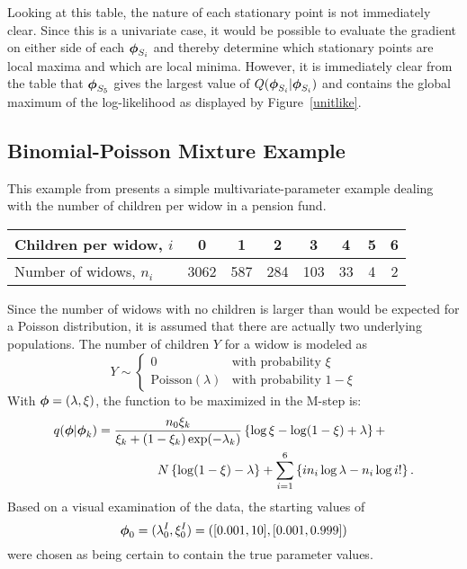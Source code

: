 Looking at this table, the nature of each stationary point is not
immediately clear.  Since this is a univariate case, it would be
possible to evaluate the gradient on either side of each
$\mbox{\boldmath $\phi$}_{S_i}$ and thereby determine which stationary points are
local maxima and which are local minima.  However, it is immediately clear
from the table that $\mbox{\boldmath $\phi$}_{S_5}$ gives the largest value of 
$Q(\mbox{\boldmath $\phi$}_{S_i}|\mbox{\boldmath $\phi$}_{S_i})$ and contains the global maximum of the
log-likelihood as displayed by Figure~\ref{unitlike}.

\subsection{Binomial-Poisson Mixture Example}
This example from \cite{Thisted} presents a simple
multivariate-parameter example dealing with the number
of children per widow in a pension fund.
\begin{center}
\begin{tabular}{l|c|c|c|c|c|c|c}
Children per widow, $i$ & 0 & 1 & 2 & 3 & 4 & 5 & 6 \\ \hline
Number of widows, $n_i$ & 3062 & 587 & 284 & 103 & 33 & 4 & 2
\end{tabular}
\end{center}
%
Since the number of widows with no children is larger than would be expected
for a Poisson distribution, it is assumed that there are actually two
underlying populations.  The number of children $Y$ for a widow is modeled
as
\begin{equation}
Y \sim \left\{ \begin{array}{ll}
0 & \mbox{with probability } \xi \\
\mbox{Poisson}(\lambda) & \mbox{with probability } 1-\xi
\end{array}\right.
\end{equation}
With $\mbox{\boldmath $\phi$}=(\lambda,\xi)$, the function to be maximized in the M-step is:
\begin{eqnarray}
\lefteqn{
q(\bfphi|\bfphi_k) = \frac{n_0 \xi_k}{\xi_k + (1-\xi_k)\exp(-\lambda_k)}
\left\{ \log\xi - \log(1-\xi)+\lambda \right\} + } \nonumber \\
 & & \hspace{1in} N \left\{ \log (1-\xi) - \lambda \right\}
+ \sum_{i=1}^6 \left\{ i n_i \log \lambda - n_i \log i! \right\}.
\end{eqnarray}
Based on a visual examination of the data, the starting values of 
$$\mbox{\boldmath $\phi$}_0 = (\lambda_0^I, \xi_0^I) = ([0.001,10],[0.001,0.999])$$ 
were chosen as being certain to contain the true parameter values.


